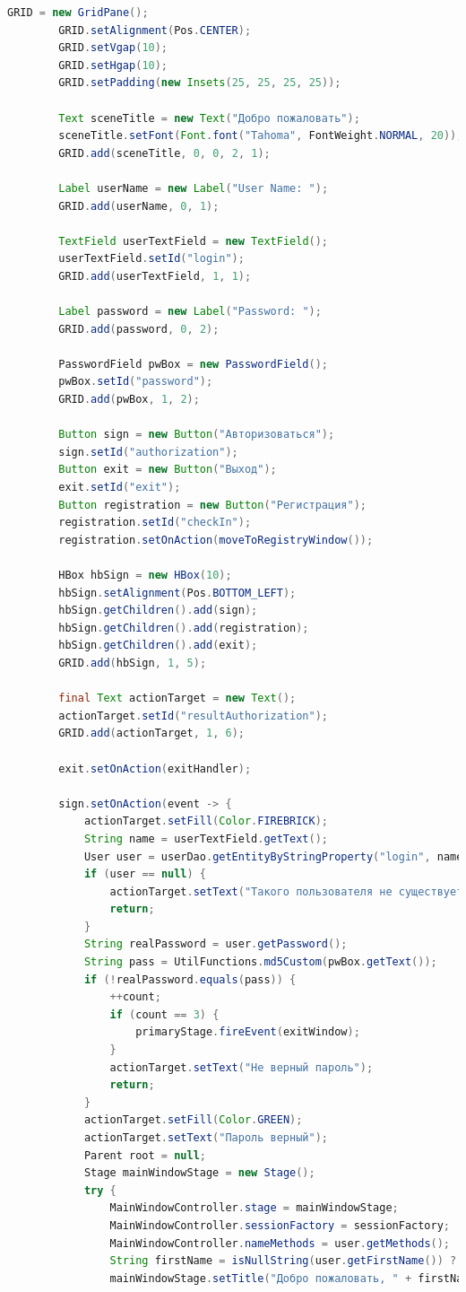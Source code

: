 \documentclass[a4paper,12pt]{article}
\begin{document}
\begin{lstlisting}[language=java, caption=код модуля Login.java]
        GRID = new GridPane();
        GRID.setAlignment(Pos.CENTER);
        GRID.setVgap(10);
        GRID.setHgap(10);
        GRID.setPadding(new Insets(25, 25, 25, 25));

        Text sceneTitle = new Text("Добро пожаловать");
        sceneTitle.setFont(Font.font("Tahoma", FontWeight.NORMAL, 20));
        GRID.add(sceneTitle, 0, 0, 2, 1);

        Label userName = new Label("User Name: ");
        GRID.add(userName, 0, 1);

        TextField userTextField = new TextField();
        userTextField.setId("login");
        GRID.add(userTextField, 1, 1);

        Label password = new Label("Password: ");
        GRID.add(password, 0, 2);

        PasswordField pwBox = new PasswordField();
        pwBox.setId("password");
        GRID.add(pwBox, 1, 2);

        Button sign = new Button("Авторизоваться");
        sign.setId("authorization");
        Button exit = new Button("Выход");
        exit.setId("exit");
        Button registration = new Button("Регистрация");
        registration.setId("checkIn");
        registration.setOnAction(moveToRegistryWindow());

        HBox hbSign = new HBox(10);
        hbSign.setAlignment(Pos.BOTTOM_LEFT);
        hbSign.getChildren().add(sign);
        hbSign.getChildren().add(registration);
        hbSign.getChildren().add(exit);
        GRID.add(hbSign, 1, 5);

        final Text actionTarget = new Text();
        actionTarget.setId("resultAuthorization");
        GRID.add(actionTarget, 1, 6);

        exit.setOnAction(exitHandler);

        sign.setOnAction(event -> {
            actionTarget.setFill(Color.FIREBRICK);
            String name = userTextField.getText();
            User user = userDao.getEntityByStringProperty("login", name);
            if (user == null) {
                actionTarget.setText("Такого пользователя не существует");
                return;
            }
            String realPassword = user.getPassword();
            String pass = UtilFunctions.md5Custom(pwBox.getText());
            if (!realPassword.equals(pass)) {
                ++count;
                if (count == 3) {
                    primaryStage.fireEvent(exitWindow);
                }
                actionTarget.setText("Не верный пароль");
                return;
            }
            actionTarget.setFill(Color.GREEN);
            actionTarget.setText("Пароль верный");
            Parent root = null;
            Stage mainWindowStage = new Stage();
            try {
                MainWindowController.stage = mainWindowStage;
                MainWindowController.sessionFactory = sessionFactory;
                MainWindowController.nameMethods = user.getMethods();
                String firstName = isNullString(user.getFirstName()) ? "Неизвестный" : user.getFirstName();
                mainWindowStage.setTitle("Добро пожаловать, " + firstName);


\end{lstlisting}
\end{document}
